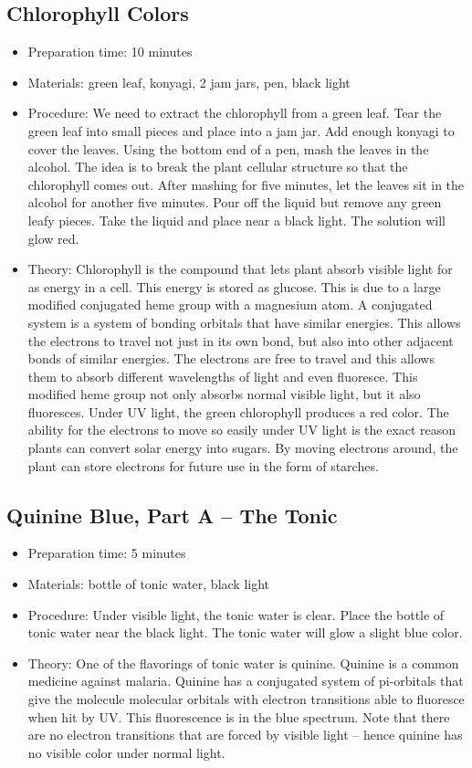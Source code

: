 \subsection{Chlorophyll Colors}
\begin{itemize}
\item{Preparation time: 10 minutes}
\item{Materials: green leaf, konyagi, 2 jam jars, pen, black light}
\item{Procedure: We need to extract the chlorophyll from a green leaf. Tear the green leaf into small pieces and place into a jam jar. Add enough konyagi to cover the leaves. Using the bottom end of a pen, mash the leaves in the alcohol. The idea is to break the plant cellular structure so that the chlorophyll comes out. After mashing for five minutes, let the leaves sit in the alcohol for another five minutes. Pour off the liquid but remove any green leafy pieces. Take the liquid and place near a black light. The solution will glow red.}
\item{Theory: Chlorophyll is the compound that lets plant absorb visible light for as energy in a cell. This energy is stored as glucose. This is due to a large modified conjugated heme group with a magnesium atom. A conjugated system is a system of bonding orbitals that have similar energies. This allows the electrons to travel not just in its own bond, but also into other adjacent bonds of similar energies. The electrons are free to travel and this allows them to absorb different wavelengths of light and even fluoresce. This modified heme group not only absorbs normal visible light, but it also fluoresces. Under UV light, the green chlorophyll produces a red color. The ability for the electrons to move so easily under UV light is the exact reason plants can convert solar energy into sugars. By moving electrons around, the plant can store electrons for future use in the form of starches.}
\end{itemize}

\subsection{Quinine Blue, Part A -- The Tonic}
\begin{itemize}
\item{Preparation time: 5 minutes}
\item{Materials: bottle of tonic water, black light}
\item{Procedure: Under visible light, the tonic water is clear. Place the bottle of tonic water near the black light. The tonic water will glow a slight blue color.}
\item{Theory: One of the flavorings of tonic water is quinine. Quinine is a common medicine against malaria. Quinine has a conjugated system of pi-orbitals that give the molecule molecular orbitals with electron transitions able to fluoresce when hit by UV. This fluorescence is in the blue spectrum. Note that there are no electron transitions that are forced by visible light -- hence quinine has no visible color under normal light.}
\end{itemize}

